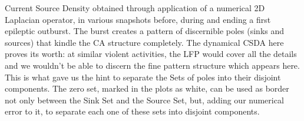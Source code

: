 Current Source Density obtained through application of a numerical 2D Laplacian
operator, in various snapshots before, during and ending a first epileptic outburst.
The burst creates a pattern of discernible poles (sinks and sources) that
kindle the CA structure completely. The dynamical CSDA here proves its worth:
at similar violent activities, the LFP would cover all the details and we wouldn't
be able to discern the fine pattern structure which appears here. This is what gave
us the hint to separate the Sets of poles into their disjoint components.
The zero set, marked in the plots as white, can be used as border not only between
the Sink Set and the Source Set, but, adding our numerical error to it, to
separate each one of these sets into disjoint components. 
